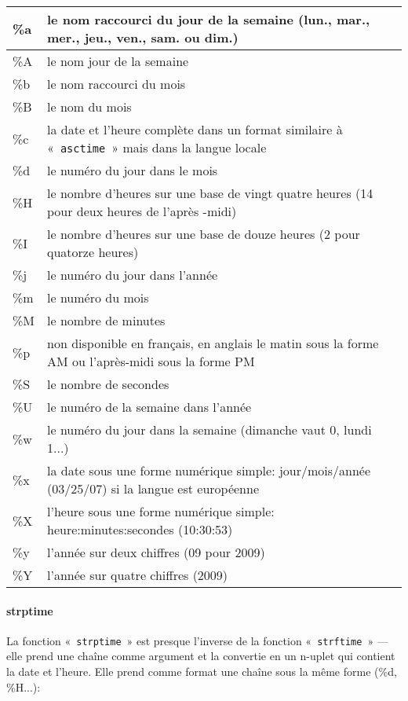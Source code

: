 \begin{center}
\begin{tabular}{|l|p{12cm}|}
\hline
\%a & le nom raccourci du jour de la semaine (lun., mar., mer., jeu., ven., sam. ou dim.) \\
\hline
\%A & le nom jour de la semaine  \\
\hline
\%b & le nom raccourci du mois \\
\hline
\%B & le nom du mois \\
\hline
\%c & la date et l'heure complète dans un format similaire à «~\texttt{asctime}~» mais dans la langue locale\\
\hline
\%d & le numéro du jour dans le mois\\
\hline
\%H & le nombre d'heures sur une base de vingt quatre heures (14 pour deux heures de l'après -midi) \\
\hline
\%I & le nombre d'heures sur une base de douze heures (2 pour quatorze heures)\\
\hline
\%j & le numéro du jour dans l'année\\
\hline
\%m & le numéro du mois \\
\hline
\%M & le nombre de minutes \\
\hline
\%p & non disponible en français, en anglais le matin sous la forme AM ou l'après-midi sous la forme PM \\
\hline
\%S & le nombre de secondes\\
\hline
\%U & le numéro de la semaine dans l'année \\
\hline
\%w & le numéro du jour dans la semaine (dimanche vaut 0, lundi 1...) \\
\hline
\%x & la date sous une forme numérique simple: jour/mois/année (03/25/07) si la langue est européenne  \\
\hline
\%X & l'heure sous une forme numérique simple: heure:minutes:secondes (10:30:53) \\
\hline
\%y & l'année sur deux chiffres (09 pour 2009) \\
\hline
\%Y & l'année sur quatre chiffres (2009) \\
\hline
\end{tabular}
\end{center}
\paragraph{strptime}

La fonction «~\texttt{strptime}~» est presque l'inverse de la fonction «~\texttt{strftime}~» --- elle prend une chaîne comme argument et la convertie en un n-uplet qui contient la date et l'heure. Elle prend comme format une chaîne sous la même forme (\%d, \%H...):


